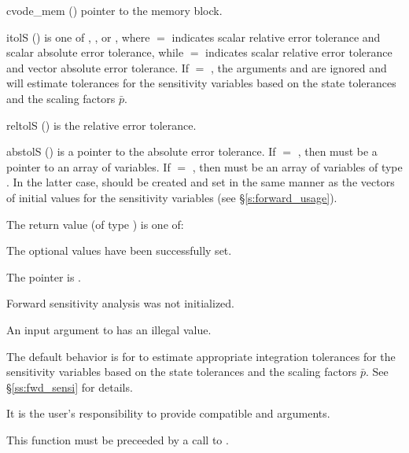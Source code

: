 {
  \begin{args}
  \item[cvode\_mem] ()
    pointer to the {\cvodes} memory block.
  \item[itolS]  () 
    is one of , , or , where  $=$  indicates scalar relative error 
    tolerance and scalar absolute error tolerance, while  $=$  indicates scalar
    relative error tolerance and vector absolute error tolerance.
    If  $=$ , the arguments  and  are ignored and
    {\cvodes} will estimate tolerances for the sensitivity variables based on the state
    tolerances and the scaling factors $\bar p$.
  \item[reltolS] ()
    is the relative error tolerance.
  \item[abstolS] ()
    is a pointer to the absolute error tolerance. 
    If  $=$ , then  must be a pointer to an array
    of  variables. 
    If  $=$ , then  must be an array of 
    variables of type  . In the latter case,  should be
    created and set in the same manner as the vectors of initial values for the
    sensitivity variables (see \S\ref{s:forward_usage}).
  \end{args}
}
{
  The return value  (of type ) is one of:
  \begin{args}
  \item[\Id{CV\_SUCCESS}] 
    The optional values have been successfully set.
  \item[\Id{CV\_MEM\_NULL}]
    The  pointer is .
  \item[\Id{CV\_NO\_SENS}]
    Forward sensitivity analysis was not initialized.
  \item[\Id{CV\_ILL\_INPUT}]
     An input argument to  has an illegal value.
  \end{args}
}
{
  The default behavior is for {\cvodes} to estimate appropriate integration 
  tolerances for the sensitivity variables based on the state tolerances and
  the scaling factors ${\bar p}$. See \S\ref{ss:fwd_sensi} for details.

  {\warn}It is the user's responsibility to provide compatible  and
   arguments.

  This function must be preceeded by a call to .
}
